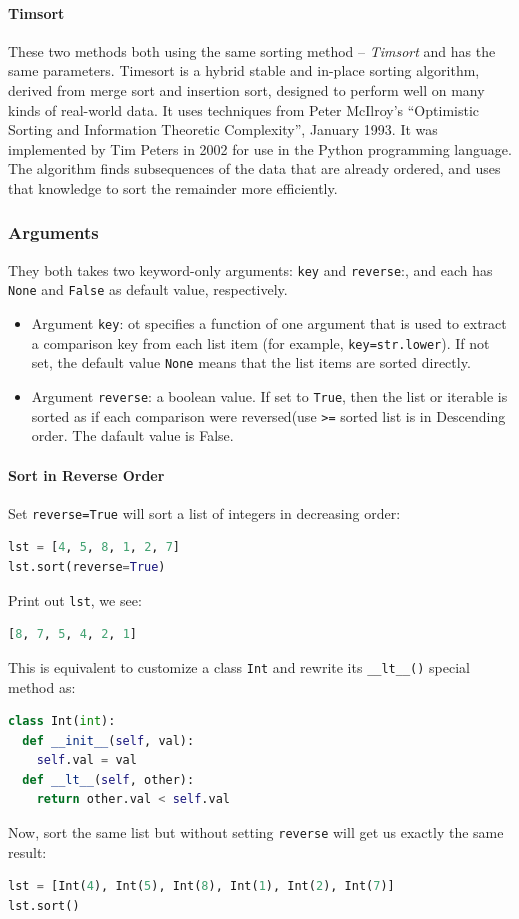 \documentclass[../main.tex]{subfiles}
\begin{document}
\paragraph{Timsort}
These two methods both using the same sorting method -- \textit{Timsort} and has the same parameters. Timesort is a hybrid stable and in-place sorting algorithm, derived from merge sort and insertion sort, designed to perform well on many kinds of real-world data. It uses techniques from Peter McIlroy's ``Optimistic Sorting and Information Theoretic Complexity'', January 1993. It was implemented by Tim Peters in 2002 for use in the Python programming language. The algorithm finds subsequences of the data that are already ordered, and uses that knowledge to sort the remainder more efficiently.

\subsubsection{Arguments}
They both  takes two keyword-only arguments: \texttt{key} and \texttt{reverse}:, and each has \texttt{None} and \texttt{False} as default value, respectively. 
\begin{itemize}
    \item Argument \texttt{key}: ot specifies a function of one argument that is used to extract a comparison key from each list item (for example, \texttt{key=str.lower}). If not set, the default value \texttt{None} means that the list items are sorted directly. 
    \item Argument \texttt{reverse}: a boolean value.  If  set to \texttt{True}, then the list or iterable is sorted as if each comparison were reversed(use \texttt{>=} sorted list is in Descending order. The dafault value is False. 
\end{itemize}
\paragraph{Sort in Reverse Order} Set \texttt{reverse=True} will sort a list of integers in decreasing order:
\begin{lstlisting}[language=Python]
lst = [4, 5, 8, 1, 2, 7]
lst.sort(reverse=True)
\end{lstlisting}
Print out \texttt{lst}, we see:
\begin{lstlisting}[language=Python]
[8, 7, 5, 4, 2, 1]
\end{lstlisting}
This is equivalent to customize a class \texttt{Int} and rewrite its \texttt{\_\_lt\_\_()} special method as:
\begin{lstlisting}[language=Python]
class Int(int):
  def __init__(self, val):
    self.val = val
  def __lt__(self, other):
    return other.val < self.val
\end{lstlisting}
Now, sort the same list but without setting \texttt{reverse} will get us exactly the same result:
\begin{lstlisting}[language=Python]
lst = [Int(4), Int(5), Int(8), Int(1), Int(2), Int(7)]
lst.sort()
\end{lstlisting}
\end{document}
